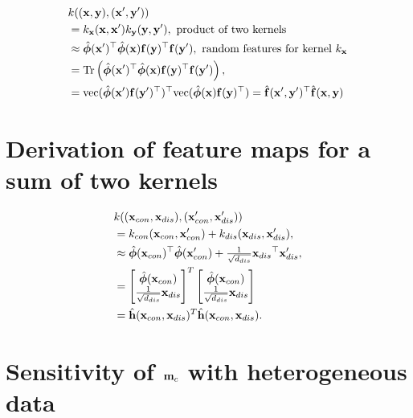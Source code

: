 \documentclass{article}
\begin{document}
\begin{align}
    & k((\mathbf{x},\mathbf{y}), (\mathbf{x}', \mathbf{y}')) \nonumber \\
    &= k_{\mathbf{x}}(\mathbf{x}, \mathbf{x}') k_{\mathbf{y}} (\mathbf{y}, \mathbf{y}'), \mbox{ product of two kernels} \nonumber \\
    &\approx \hat{\mathbf{\bm{\phi}}}(\mathbf{x}'){^\top} \hat{\mathbf{\bm{\phi}}}(\mathbf{x}) \mathbf{f}(\mathbf{y}){^\top} \mathbf{f}(\mathbf{y}'),  \mbox{ random features for kernel } k_{\mathbf{x}} \nonumber \\
    &= \mbox{Tr}\left(\hat{\mathbf{\bm{\phi}}}(\mathbf{x}'){^\top} \hat{\mathbf{\bm{\phi}}}(\mathbf{x}) \mathbf{f}(\mathbf{y}){^\top} \mathbf{f}(\mathbf{y}')\right), \nonumber \\
    &= \mbox{vec}( \hat{\mathbf{\bm{\phi}}}(\mathbf{x}') \mathbf{f}(\mathbf{y}'){^\top}){^\top} \mbox{vec}( \hat{\mathbf{\bm{\phi}}}(\mathbf{x}) \mathbf{f}(\mathbf{y}){^\top}) = \hat{\mathbf{f}}(\mathbf{x}', \mathbf{y}') {^\top} \hat{\mathbf{f}}(\mathbf{x}, \mathbf{y}) \nonumber 
\end{align} 



\section{Derivation of feature maps for a sum of two kernels}

\begin{align}
     &k((\mathbf{x}_{con}, \mathbf{x}_{dis}), (\mathbf{x}'_{con}, \mathbf{x}'_{dis})) \nonumber \\
     &= k_{con}(\mathbf{x}_{con}, \mathbf{x}'_{con}) + k_{dis} (\mathbf{x}_{dis}, \mathbf{x}'_{dis}), \nonumber \\
    &\approx \hat{\mathbf{\bm{\phi}}}(\mathbf{x}_{con}){^\top} \hat{\mathbf{\bm{\phi}}}(\mathbf{x}'_{con}) + \tfrac{1}{\sqrt{d_{dis}}} \mathbf{x}_{dis}{^\top}\mathbf{x}_{dis}', \nonumber \\
    &= \begin{bmatrix} 
    \hat{\mathbf{\bm{\phi}}}(\mathbf{x}_{con})  \nonumber \\
     \frac{1}{\sqrt{d_{dis}}} \mathbf{x}_{dis}
    \end{bmatrix}^T
    \begin{bmatrix} 
    \hat{\mathbf{\bm{\phi}}}(\mathbf{x}_{con})  \nonumber \\
     \frac{1}{\sqrt{d_{dis}}} \mathbf{x}_{dis}
    \end{bmatrix} \nonumber  \\
    &= \hat{\mathbf{h}}(\mathbf{x}_{con}, \mathbf{x}_{dis})^T \hat{\mathbf{h}}(\mathbf{x}_{con}, \mathbf{x}_{dis}).
\end{align} 

\section{Sensitivity of $\mathbf{m}_c$ with heterogeneous data}
\end{document}
